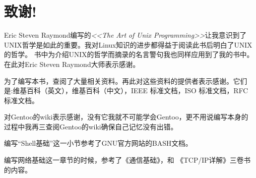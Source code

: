 \thispagestyle{empty}
\chapter*{致谢!}

Eric Steven Raymond编写的\textit{<<The Art of Unix Programming>>}让我意识到了UNIX哲学是如此的重要。我对Linux知识的进步都得益于阅读此书后明白了UNIX的哲学。
书中为介绍UNIX的哲学而摘录的名言警句我也同样应用到了我的书中。在此对Eric Steven Raymond大师表示感谢。


为了编写本书，查阅了大量相关资料。再此对这些资料的提供者表示感谢。它们是:维基百科（英文），维基百科（中文），IEEE 标准文档，ISO 标准文档，RFC 标准文档。

对Gentoo的wiki表示感谢，没有它我就不可能学会Gentoo，更不用说编写本身的过程中我再三查阅Gentoo的wiki确保自己记忆没有出错。

编写“Shell基础”这一小节参考了GNU官方网站的BASH文档。

编写网络基础这一章节的时候，参考了《通信基础》，和 《TCP/IP详解》三卷书的内容。

\newpage\thispagestyle{empty}
